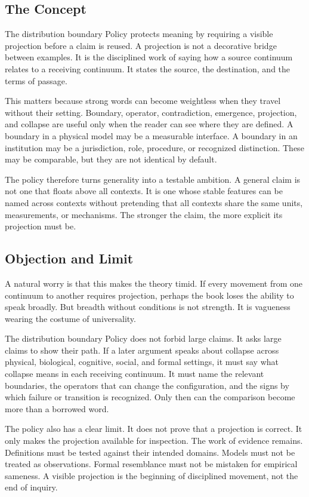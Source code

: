 \documentclass[11pt,a4paper,openany]{book}
\begin{document}
\subsection{The Concept}
The distribution boundary Policy protects meaning by requiring a visible projection before a claim is reused. A projection is not a decorative bridge between examples. It is the disciplined work of saying how a source continuum relates to a receiving continuum. It states the source, the destination, and the terms of passage. \cite{haken_synergetics,nicolis_prigogine_selforg}\par
This matters because strong words can become weightless when they travel without their setting. Boundary, operator, contradiction, emergence, projection, and collapse are useful only when the reader can see where they are defined. A boundary in a physical model may be a measurable interface. A boundary in an institution may be a jurisdiction, role, procedure, or recognized distinction. These may be comparable, but they are not identical by default.\par
The policy therefore turns generality into a testable ambition. A general claim is not one that floats above all contexts. It is one whose stable features can be named across contexts without pretending that all contexts share the same units, measurements, or mechanisms. The stronger the claim, the more explicit its projection must be.\par
\subsection{Objection and Limit}
A natural worry is that this makes the theory timid. If every movement from one continuum to another requires projection, perhaps the book loses the ability to speak broadly. But breadth without conditions is not strength. It is vagueness wearing the costume of universality. \cite{haken_synergetics,nicolis_prigogine_selforg}\par
The distribution boundary Policy does not forbid large claims. It asks large claims to show their path. If a later argument speaks about collapse across physical, biological, cognitive, social, and formal settings, it must say what collapse means in each receiving continuum. It must name the relevant boundaries, the operators that can change the configuration, and the signs by which failure or transition is recognized. Only then can the comparison become more than a borrowed word.\par
The policy also has a clear limit. It does not prove that a projection is correct. It only makes the projection available for inspection. The work of evidence remains. Definitions must be tested against their intended domains. Models must not be treated as observations. Formal resemblance must not be mistaken for empirical sameness. A visible projection is the beginning of disciplined movement, not the end of inquiry.\par
\end{document}
